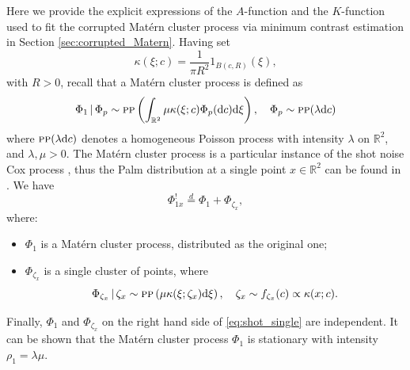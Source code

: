\documentclass[11pt,a4paper,oneside]{article}
\newcommand{\indicator}{\ensuremath{{1}}}
\newcommand{\dd}{\mathrm d}
\newcommand{\X}{\mathbb{X}}
\newcommand{\R}{\mathbb{R}}
\renewcommand{\mid}{\ensuremath{\,|\,}}
\theoremstyle{definition}
\theoremstyle{remark}
\begin{document}
Here we provide the explicit expressions of the  $A$-function and the $K$-function used to fit the corrupted Mat\'ern cluster process via minimum contrast estimation
in Section \ref{sec:corrupted_Matern}.
Having set
\[
\kappa ( \xi ; c ) = \frac{1}{\pi R^2} \indicator_{B (c, R)} (\xi),
\]
with $R >0$, recall that a Mat\'ern cluster process is defined as
\[
\Phi_1 \mid \Phi_p \sim \textsc{pp} \left( \int_{\R^2}  \mu  \kappa (\xi ; c) \Phi_p (\dd c) \dd \xi \right), \quad 
\Phi_p  \sim \textsc{pp} (\lambda \dd c)
\]
where $\textsc{pp} (\lambda \dd c)$ denotes a homogeneous Poisson process with intensity $\lambda$ on $\R^2$, and $\lambda, \mu >0$.
The Mat\'ern cluster process is a particular instance  of the shot noise Cox process \citep{Mo03Cox}, thus the Palm distribution at a single point $x \in \R^2$ can be found in \citep{Mo03Cox}. We have
\begin{equation}
    \label{eq:shot_single}
    \Phi_{1x}^! \stackrel{d}{=} \Phi_1 + \Phi_{\zeta_x},
\end{equation}
where:
\begin{itemize}
    \item[(i)]  $\Phi_1$ is a Mat\'ern cluster process, distributed as the original one;
    \item[(ii)]  $\Phi_{\zeta_x} $ is a single cluster of points, where 
    \[
    \Phi_{\zeta_x} \mid \zeta_x \sim \textsc{pp} \left(  \mu \kappa ( \xi ; \zeta_x) \dd \xi \right),
    \quad
    \zeta_x \sim f_{\zeta_x} (c) \propto \kappa (x ; c).
    \]
\end{itemize}
Finally,  $\Phi_1$ and $\Phi_{\zeta_x}$ on the right hand side of \eqref{eq:shot_single} are independent. It can be shown that the Mat\'ern cluster process $\Phi_1$ is stationary with intensity $\rho_1 = \lambda\mu$.\\
\end{document}
